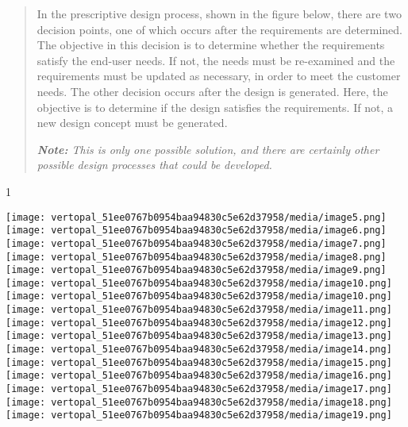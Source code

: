 \documentclass[
]{article}
\begin{document}
\begin{quote}
In the prescriptive design process, shown in the figure below, there are
two decision points, one of which occurs after the requirements are
determined. The objective in this decision is to determine whether the
requirements satisfy the end-user needs. If not, the needs must be
re-examined and the requirements must be updated as necessary, in order
to meet the customer needs. The other decision occurs after the design
is generated. Here, the objective is to determine if the design
satisfies the requirements. If not, a new design concept must be
generated.

\emph{\textbf{Note:} This is only one possible solution, and there are
certainly other possible design processes that could be developed.}
\end{quote}

1

\texttt{[image: vertopal\_51ee0767b0954baa94830c5e62d37958/media/image5.png]}\texttt{[image: vertopal\_51ee0767b0954baa94830c5e62d37958/media/image6.png]}\texttt{[image: vertopal\_51ee0767b0954baa94830c5e62d37958/media/image7.png]}\texttt{[image: vertopal\_51ee0767b0954baa94830c5e62d37958/media/image8.png]}\texttt{[image: vertopal\_51ee0767b0954baa94830c5e62d37958/media/image9.png]}\texttt{[image: vertopal\_51ee0767b0954baa94830c5e62d37958/media/image10.png]}\texttt{[image: vertopal\_51ee0767b0954baa94830c5e62d37958/media/image10.png]}\texttt{[image: vertopal\_51ee0767b0954baa94830c5e62d37958/media/image11.png]}\texttt{[image: vertopal\_51ee0767b0954baa94830c5e62d37958/media/image12.png]}\texttt{[image: vertopal\_51ee0767b0954baa94830c5e62d37958/media/image13.png]}\texttt{[image: vertopal\_51ee0767b0954baa94830c5e62d37958/media/image14.png]}\texttt{[image: vertopal\_51ee0767b0954baa94830c5e62d37958/media/image15.png]}\texttt{[image: vertopal\_51ee0767b0954baa94830c5e62d37958/media/image16.png]}\texttt{[image: vertopal\_51ee0767b0954baa94830c5e62d37958/media/image17.png]}\texttt{[image: vertopal\_51ee0767b0954baa94830c5e62d37958/media/image18.png]}\texttt{[image: vertopal\_51ee0767b0954baa94830c5e62d37958/media/image19.png]}
\end{document}
